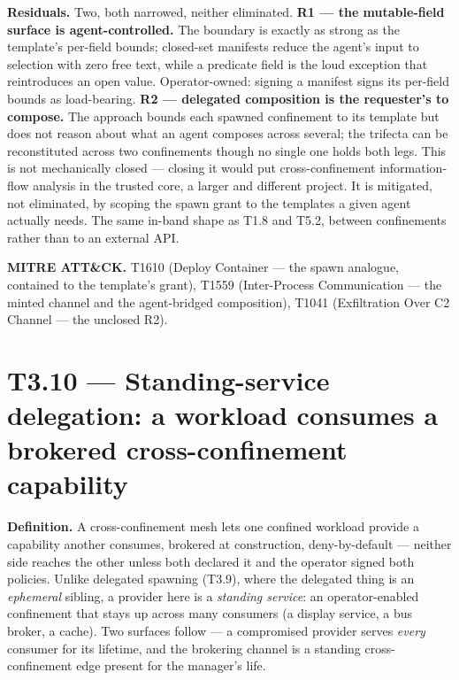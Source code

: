 \textbf{Residuals.} Two, both narrowed, neither eliminated. \textbf{R1
--- the mutable-field surface is agent-controlled.} The boundary is
exactly as strong as the template's per-field bounds; closed-set
manifests reduce the agent's input to selection with zero free text,
while a predicate field is the loud exception that reintroduces an open
value. Operator-owned: signing a manifest signs its per-field bounds as
load-bearing. \textbf{R2 --- delegated composition is the requester's to
compose.} The approach bounds each spawned confinement to its template
but does not reason about what an agent composes across several; the
trifecta can be reconstituted across two confinements though no single
one holds both legs. This is not mechanically closed --- closing it
would put cross-confinement information-flow analysis in the trusted
core, a larger and different project. It is mitigated, not eliminated,
by scoping the spawn grant to the templates a given agent actually
needs. The same in-band shape as T1.8 and T5.2, between confinements
rather than to an external API.

\textbf{MITRE ATT\&CK.} T1610 (Deploy Container --- the spawn analogue,
contained to the template's grant), T1559 (Inter-Process Communication
--- the minted channel and the agent-bridged composition), T1041
(Exfiltration Over C2 Channel --- the unclosed R2).

\hypertarget{t3.10-standing-service-delegation-a-workload-consumes-a-brokered-cross-confinement-capability}{%
\section{T3.10 --- Standing-service delegation: a workload consumes a
brokered cross-confinement
capability}\label{t3.10-standing-service-delegation-a-workload-consumes-a-brokered-cross-confinement-capability}}

\textbf{Definition.} A cross-confinement mesh lets one confined workload
provide a capability another consumes, brokered at construction,
deny-by-default --- neither side reaches the other unless both declared
it and the operator signed both policies. Unlike delegated spawning
(T3.9), where the delegated thing is an \emph{ephemeral} sibling, a
provider here is a \emph{standing service}: an operator-enabled
confinement that stays up across many consumers (a display service, a
bus broker, a cache). Two surfaces follow --- a compromised provider
serves \emph{every} consumer for its lifetime, and the brokering channel
is a standing cross-confinement edge present for the manager's life.

